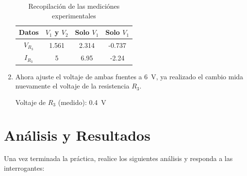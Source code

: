 \documentclass{article}
\begin{document}
\begin{enumerate}
        \begin{table}[ht]
            \centering
            \begin{tabular}{|c|c|c|c|} %
                \midrule 
                Datos       & $V_1$ y $V_2$ & Solo $V_1$    & Solo $V_1$    \\
                \midrule
                $V_{R_3}$   & 1.561         & 2.314         & -0.737        \\
                $I_{R_3}$   & 5             & 6.95          & -2.24         \\
                \midrule
            \end{tabular}
            \caption{Recopilación de las mediciónes experimentales}\label{tab:3}
        \end{table}

        \item Ahora ajuste el voltaje de ambas fuentes a \SI{6}{\volt}, ya realizado el cambio mida nuevamente el voltaje de la resistencia $R_3$.
        
        Voltaje de $R_3$ (medido): \SI{0.4}{\volt}
    \end{enumerate}

    \section{Análisis y Resultados}

    Una vez terminada la práctica, realice los siguientes análisis y responda a las interrogantes:
\end{document}

